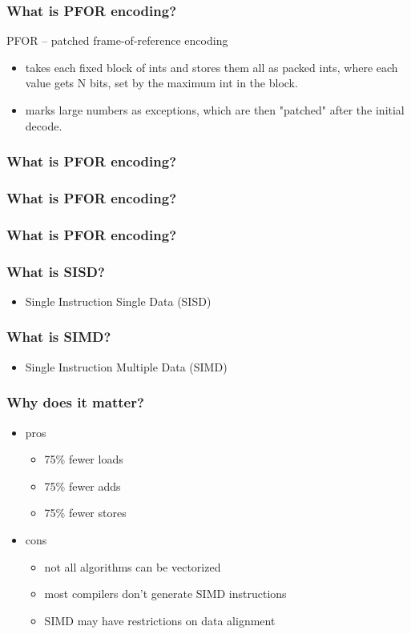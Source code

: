 \documentclass{beamer}
\begin{document}
  	\begin{frame}
  		\frametitle{What is PFOR encoding?}
  		PFOR	 -- patched frame-of-reference encoding
  		\begin{itemize}
  			\item takes each fixed block of ints and stores them all as packed ints, where each value gets N bits, set by the maximum int in the block.
  			\item marks large numbers as exceptions, which are then "patched" after the initial decode.	
  		\end{itemize}
  	\end{frame}
  	\begin{frame}
  		\frametitle{What is PFOR encoding?}
  		
  	\end{frame}
  	\begin{frame}
  		\frametitle{What is PFOR encoding?}
  		
  	\end{frame}
  	\begin{frame}
  		\frametitle{What is PFOR encoding?}
  		
  	\end{frame}
  	\begin{frame}
    		\frametitle{What is SISD?}
    		\begin{itemize}
    		    \item Single Instruction Single Data (SISD)
		\end{itemize}
  	\end{frame}
  	\begin{frame}
    		\frametitle{What is SIMD?}
    		\begin{itemize}
    		    \item Single Instruction Multiple Data (SIMD)
		\end{itemize}
  	\end{frame}
  	\begin{frame}
    		\frametitle{Why does it matter?}
    		\begin{itemize}
    		    \item pros
    		    \begin{itemize}
    		    		\item 75\% fewer loads
    		    		\item 75\% fewer adds
    		    		\item 75\% fewer stores
    		    \end{itemize}
    		    \item cons
    		    \begin{itemize}
    		    		\item not all algorithms can be vectorized
    		    		\item most compilers don't generate SIMD instructions
    		    		\item SIMD may have restrictions on data alignment
    		    \end{itemize}
		\end{itemize}
  	\end{frame}  	
  	
\end{document}
